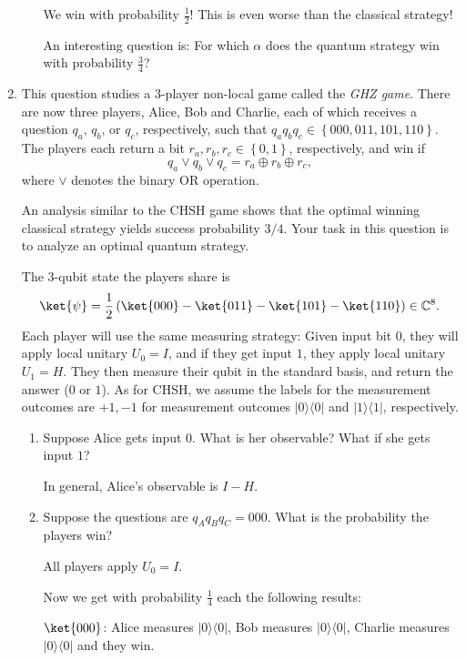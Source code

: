\documentclass{article}
\newcommand{\ketbra}[2]{|#1\rangle\!\langle #2|}
\newcommand{\set}[1]{{\left\{#1\right\}}}    %
\newcommand{\complex}{{\mathbb C}}
\begin{document}
\begin{enumerate}
\begin{enumerate}
                We win with probability $\frac{1}{2}$! This is even worse than the classical strategy!

                An interesting question is: For which $\alpha$ does the quantum strategy win with probability $\frac{3}{4}$?
        \end{enumerate}

  \item This question studies a $3$-player non-local game called the \emph{GHZ game}. There are now three players, Alice, Bob and Charlie, each of which receives a question $q_a$, $q_b$, or $q_c$, respectively, such that $q_aq_bq_c\in\set{000,011,101,110}$. The players each return a bit $r_a,r_b,r_c\in\set{0,1}$, respectively, and win if
        \[
          q_a\vee q_b\vee q_c = r_a\oplus r_b\oplus r_c,
        \]
        where $\vee$ denotes the binary OR operation.

        An analysis similar to the CHSH game shows that the optimal winning classical strategy yields success probability $3/4$. Your task in this question is to analyze an optimal quantum strategy.

        The $3$-qubit state the players share is
        \[
          \ket{\psi}=\frac{1}{2}\left(\ket{000}-\ket{011}-\ket{101}-\ket{110}\right)\in\complex^8.
        \]
        Each player will use the same measuring strategy: Given input bit $0$, they will apply local unitary $U_0=I$, and if they get input $1$, they apply local unitary $U_1=H$. They then measure their qubit in the standard basis, and return the answer ($0$ or $1$). As for CHSH, we assume the labels for the measurement outcomes are $+1,-1$ for measurement outcomes $\ketbra{0}{0}$ and $\ketbra{1}{1}$, respectively.
        \begin{enumerate}
          \item Suppose Alice gets input $0$. What is her observable? What if she gets input $1$?

                In general, Alice's observable is $I-H$.

          \item Suppose the questions are $q_Aq_Bq_C=000$. What is the probability the players win?

                All players apply $U_0=I$.

                Now we get with probability $\frac{1}{4}$ each the following results:

                $\ket{000}$: Alice measures $\ketbra{0}{0}$, Bob measures $\ketbra{0}{0}$, Charlie measures $\ketbra{0}{0}$ and they win.


\end{enumerate}
\end{enumerate}
\end{document}
